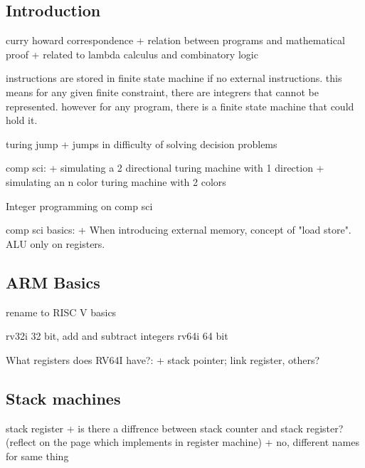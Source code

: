 
\subsection{Introduction}

curry howard correspondence
+ relation between programs and mathematical proof
+ related to lambda calculus and combinatory logic

instructions are stored in finite state machine if no external instructions. this means for any given finite constraint, there are integrers that cannot be represented. however for any program, there is a finite state machine that could hold it.

turing jump
+ jumps in difficulty of solving decision problems

comp sci:
+ simulating a 2 directional turing machine with 1 direction
+ simulating an n color turing machine with 2 colors

Integer programming on comp sci

comp sci basics:
+ When introducing external memory, concept of "load store". ALU only on registers.

\subsection{ARM Basics}
rename to RISC V basics

rv32i
32 bit, add and subtract integers
rv64i
64 bit

What registers does RV64I have?:
+ stack pointer; link register, others?
\subsection{Stack machines}
stack register
+ is there a diffrence between stack counter and stack register? (reflect on the page which implements in register machine)
+ no, different names for same thing


